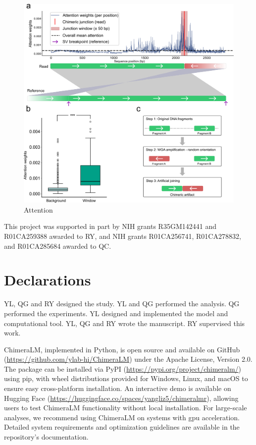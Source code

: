 \documentclass[pdflatex,sn-nature]{sn-jnl}%
\theoremstyle{thmstyleone}%
\theoremstyle{thmstyletwo}%
\theoremstyle{thmstylethree}%
\begin{document}
\begin{figure}[!ht]
	\begin{center}
		\includegraphics[width=\textwidth]{final_figures/sf3}
	\end{center}
	\caption{Attention}\label{fig:sf3}
\end{figure}


This project was supported in part by NIH grants R35GM142441 and R01CA259388 awarded to RY, and NIH grants R01CA256741, R01CA278832, and R01CA285684 awarded to QC.

\section*{Declarations}


YL, QG and RY designed the study.
YL and QG performed the analysis.
QG performed the experiments.
YL designed and implemented the model and computational tool.
YL, QG and RY wrote the manuscript.
RY supervised this work.



ChimeraLM, implemented in Python, is open source and available on GitHub (\url{https://github.com/ylab-hi/ChimeraLM}) under the Apache License, Version 2.0.
The package can be installed via PyPI (\url{https://pypi.org/project/chimeralm/}) using pip, with wheel distributions provided for Windows, Linux, and macOS to ensure easy cross-platform installation.
An interactive demo is available on Hugging Face (\url{https://huggingface.co/spaces/yangliz5/chimeralmr}), allowing users to test ChimeraLM functionality without local installation.
For large-scale analyses, we recommend using ChimeraLM on systems with \gls{gpu} acceleration. Detailed system requirements and optimization guidelines are available in the repository's documentation.
\end{document}

